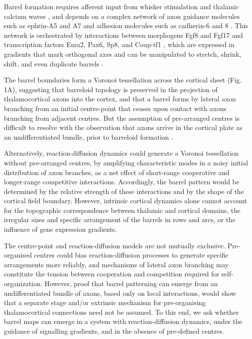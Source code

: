 \documentclass[9pt,lineno]{elife}
\begin{document}
Barrel formation requires afferent input from whisker stimulation and thalamic
calcium waves \citep{anton-bolanos_prenatal_2019}, and depends on a complex
network of axon guidance molecules such as ephrin-A5 and A7 and adhesion
molecules such as cadherin-6 and 8
\citep{vanderhaeghen_mapping_2000,miller_epha7-ephrin-a5_2006}.  This network
is orchestrated by interactions between morphogens Fgf8 and Fgf17 and
transcription factors Emx2, Pax6, Sp8, and Coup-tf1
\citep{shimogori_fibroblast_2005}, which are expressed in gradients that mark
orthogonal axes and can be manipulated to stretch, shrink, shift, and even
duplicate barrels \cite{assimacopoulos_fibroblast_2012}.

The barrel boundaries form a Voronoi tessellation across the cortical sheet
\citep{senft_mouse_1991} (Fig.\,1A), suggesting that barreloid topology is
preserved in the projection of thalamocortical axons into the cortex, and that
a barrel forms by lateral axon branching from an initial centre-point that
ceases upon contact with axons branching from adjacent centres.   But the assumption of pre-arranged
centres is difficult to resolve with the observation that axons arrive in the
cortical plate as an undifferentiated bundle, prior to barreloid formation
\cite{agmon_organized_1993}.

Alternatively, reaction-diffusion dynamics could generate a Voronoi
tessellation without pre-arranged centres, by amplifying characteristic modes
in a noisy initial distribution of axon branches, as a net effect of
short-range cooperative and longer-range competitive
interactions. Accordingly, the barrel pattern would be determined by the
relative strength of these interactions and by the shape of the cortical field
boundary. However, intrinsic cortical dynamics alone cannot account for the
topographic correspondence between thalamic and cortical domains, the
irregular sizes and specific arrangement of the barrels in rows and arcs, or
the influence of gene expression gradients.

The centre-point and reaction-diffusion models are not mutually
exclusive. Pre-organised centres could bias reaction-diffusion processes to
generate specific arrangements more reliably, and mechanisms of lateral axon
branching may constitute the tension between cooperation and competition
required for self-organization. However, proof that barrel patterning can
emerge from an undifferentiated bundle of axons, based only on local
interactions, would show that a separate stage and/or extrinsic mechanism for
pre-organising thalamocortical connections need not be assumed. To this end,
we ask whether barrel maps can emerge in a system with reaction-diffusion
dynamics, under the guidance of signalling gradients, and in the absence of
pre-defined centres.
\end{document}
